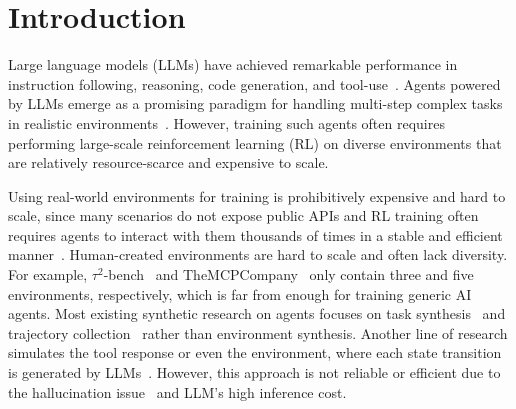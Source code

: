 \documentclass{article}
\theoremstyle{plain}
\theoremstyle{definition}
\theoremstyle{remark}
\newcommand{\taubench}{$\tau^2$-bench\xspace}
\begin{document}
\section{Introduction}
\label{sec:intro}
Large language models (LLMs) have achieved remarkable performance in instruction following, reasoning, code generation, and tool-use~\citep{humaneval,schick2023toolformer,openai_gpt5_2025,claude45,gemini2.5,deepseek-r1}. Agents powered by LLMs emerge as a promising paradigm for handling multi-step complex tasks in realistic environments~\citep{nakano2021webgpt,react,sweagent,qin2024toolllm}. However, training such agents often requires performing large-scale reinforcement learning (RL) on diverse environments that are relatively resource-scarce and expensive to scale.

Using real-world environments for training is prohibitively expensive and hard to scale, since many scenarios do not expose public APIs and RL training often requires agents to interact with them thousands of times in a stable and efficient manner~\citep{rlchallengesinrealworld,qin2024toolllm,agentcompany,mcpuniverse}.
Human-created environments are hard to scale and often lack diversity. For example, \taubench~\citep{taubench2} and TheMCPCompany~\citep{themcpcompany} only contain three and five environments, respectively, which is far from enough for training generic AI agents.
Most existing synthetic research on agents focuses on task synthesis~\citep{selfinstruct,chen2024agent,agentsynth,patil2024gorilla,wang2026adapting} and trajectory collection~\citep{xu2024agenttrek,li2025websailor,song-etal-2024-agentbank} rather than environment synthesis.
Another line of research simulates the tool response or even the environment, where each state transition is generated by LLMs~\citep{liu2024apigen,lu-etal-2025-toolsandbox,li2025simulatingenvironmentsreasoningmodels,li2025wordworldlargelanguage,chen2025scalingagentlearningexperience}. However, this approach is not reliable or efficient due to the hallucination issue~\citep{wang-etal-2024-language,kalai2025languagemodelshallucinate} and LLM's high inference cost.
\end{document}
